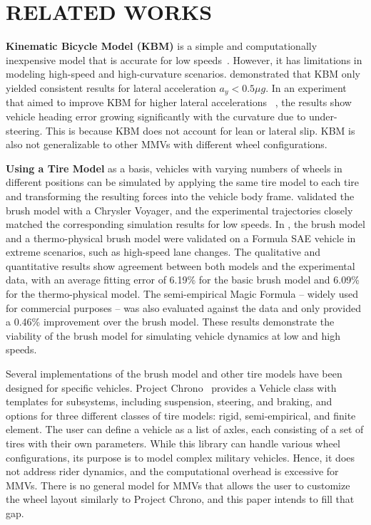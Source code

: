 \documentclass[letterpaper, 10 pt, conference]{ieeeconf}  %
\begin{document}
\section{RELATED WORKS}

{\bf Kinematic Bicycle Model (KBM)} is a simple and computationally inexpensive model that is accurate for low speeds~\cite{kooijman2008experimental}.  However, it has limitations in modeling high-speed and high-curvature scenarios. \cite{polackKBM2017} demonstrated that KBM only yielded consistent results for lateral acceleration $a_y<0.5\mu g$. In an experiment that aimed to improve KBM for higher lateral accelerations ~\cite{matute2019KBM}, the results show vehicle heading error growing significantly with the curvature due to under-steering. This is because KBM does not account for lean or lateral slip. KBM is also not generalizable to other MMVs with different wheel configurations. 

{\bf Using a Tire Model} as a basis, vehicles with varying numbers of wheels in different positions can be simulated by applying the same tire model to each tire and transforming the resulting forces into the vehicle body frame. \cite{szabo2012vehicle} validated the brush model with a Chrysler Voyager, and the experimental trajectories closely matched the corresponding simulation results for low speeds. In \cite{ozerem2019brush}, the brush model and a thermo-physical brush model were validated on a Formula SAE vehicle in extreme scenarios, such as high-speed lane changes. The qualitative and quantitative results show agreement between both models and the experimental data, with an average fitting error of 6.19\% for the basic brush model and 6.09\% for the thermo-physical model. The semi-empirical Magic Formula -- widely used for commercial purposes -- was also evaluated against the data and only provided a 0.46\% improvement over the brush model. These results demonstrate the viability of the brush model for simulating vehicle dynamics at low and high speeds.

Several implementations of the brush model and other tire models have been designed for specific vehicles. Project Chrono~\cite{chrono} provides a Vehicle class with templates for subsystems, including suspension, steering, and braking, and options for three different classes of tire models: rigid, semi-empirical, and finite element. The user can define a vehicle as a list of axles, each consisting of a set of tires with their own parameters. While this library can handle various wheel configurations, its purpose is to model complex military vehicles. Hence, it does not address rider dynamics, and the computational overhead is excessive for MMVs. There is no general model for MMVs that allows the user to customize the wheel layout similarly to Project Chrono, and this paper intends to fill that gap.
\end{document}
